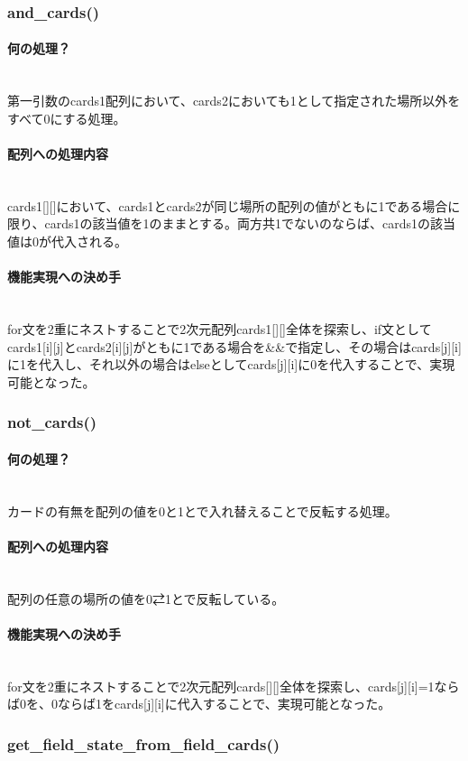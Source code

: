 \documentclass[11pt,a4paper, uplatex]{jsarticle}
\begin{document}
\subsubsection{and\_cards()}
\paragraph{何の処理？}\mbox{}\\
第一引数のcards1配列において、cards2においても1として指定された場所以外をすべて0にする処理。
\paragraph{配列への処理内容}\mbox{}\\
cards1[][]において、cards1とcards2が同じ場所の配列の値がともに1である場合に限り、cards1の該当値を1のままとする。両方共1でないのならば、cards1の該当値は0が代入される。
\paragraph{機能実現への決め手}\mbox{}\\
for文を2重にネストすることで2次元配列cards1[][]全体を探索し、if文としてcards1[i][j]とcards2[i][j]がともに1である場合を\&\&で指定し、その場合はcards[j][i]に1を代入し、それ以外の場合はelseとしてcards[j][i]に0を代入することで、実現可能となった。
%
\subsubsection{not\_cards()}
\paragraph{何の処理？}\mbox{}\\
カードの有無を配列の値を0と1とで入れ替えることで反転する処理。
\paragraph{配列への処理内容}\mbox{}\\
配列の任意の場所の値を0⇄1とで反転している。
\paragraph{機能実現への決め手}\mbox{}\\
for文を2重にネストすることで2次元配列cards[][]全体を探索し、cards[j][i]=1ならば0を、0ならば1をcards[j][i]に代入することで、実現可能となった。
%
\subsubsection{get\_field\_state\_from\_field\_cards()}
\end{document}
